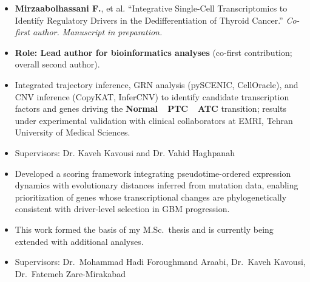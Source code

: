 \documentclass[11pt,a4paper,ragged2e]{altacv}
\begin{document}


\begin{itemize}[label=\textcolor{purpleDaffodi}{\textbullet}]
    \item \textbf{Mirzaabolhassani F.}, et al. ``Integrative Single-Cell Transcriptomics to Identify Regulatory Drivers in the Dedifferentiation of Thyroid Cancer.'' \textit{Co-first author. Manuscript in preparation.}
\end{itemize}




\begin{itemize}[label=\textcolor{purpleDaffodi}{\textbullet}]
    \item \textbf{Role: Lead author for bioinformatics analyses} (co-first contribution; overall second author).
    \item Integrated trajectory inference, GRN analysis (pySCENIC, CellOracle), and CNV inference (CopyKAT, InferCNV) to identify candidate transcription factors and genes driving the \textbf{Normal~\textrightarrow~PTC~\textrightarrow~ATC} transition; results under experimental validation with clinical collaborators at EMRI, Tehran University of Medical Sciences.
    \item Supervisors: Dr. Kaveh Kavousi and Dr. Vahid Haghpanah
\end{itemize}
\newpage
{}
\begin{itemize}[label=\textcolor{purpleDaffodi}{\textbullet}]
    \item Developed a scoring framework integrating pseudotime-ordered expression dynamics with evolutionary distances inferred from mutation data, enabling prioritization of genes whose transcriptional changes are phylogenetically consistent with driver-level selection in GBM progression.
    \item This work formed the basis of my M.Sc.\ thesis and is currently being extended with additional analyses.
    \item Supervisors: Dr.\ Mohammad Hadi Foroughmand Araabi, Dr.\ Kaveh Kavousi, Dr.\ Fatemeh Zare-Mirakabad
\end{itemize}
\end{document}
